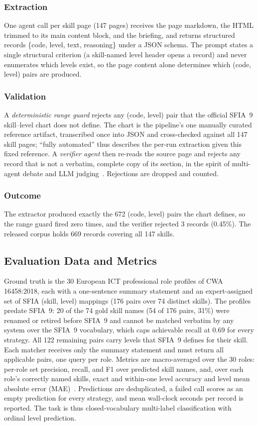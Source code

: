 \documentclass[conference]{IEEEtran}
\begin{document}
\subsubsection{Extraction} One agent call per skill page (147 pages) receives the page markdown, the HTML trimmed to its main content block, and the briefing, and returns structured records \{code, level, text, reasoning\} under a JSON schema. The prompt states a single structural criterion (a skill-named level header opens a record) and never enumerates which levels exist, so the page content alone determines which (code, level) pairs are produced.

\subsubsection{Validation} A \emph{deterministic range guard} rejects any (code, level) pair that the official SFIA~9 skill--level chart does not define. The chart is the pipeline's one manually curated reference artifact, transcribed once into JSON and cross-checked against all 147 skill pages; ``fully automated'' thus describes the per-run extraction given this fixed reference. A \emph{verifier agent} then re-reads the source page and rejects any record that is not a verbatim, complete copy of its section, in the spirit of multi-agent debate and LLM judging~\cite{du2024debate,chan2024chateval}. Rejections are dropped and counted.

\subsubsection{Outcome} The extractor produced exactly the 672 (code, level) pairs the chart defines, so the range guard fired zero times, and the verifier rejected 3 records (0.45\%). The released corpus holds 669 records covering all 147 skills.

\subsection{Evaluation Data and Metrics}\label{sec:evaldata}
Ground truth is the 30 European ICT professional role profiles of CWA 16458:2018, each with a one-sentence summary statement and an expert-assigned set of SFIA (skill, level) mappings (176 pairs over 74 distinct skills). The profiles predate SFIA~9: 20 of the 74 gold skill names (54 of 176 pairs, 31\%) were renamed or retired before SFIA~9 and cannot be matched verbatim by any system over the SFIA~9 vocabulary, which caps achievable recall at 0.69 for every strategy. All 122 remaining pairs carry levels that SFIA~9 defines for their skill. Each matcher receives only the summary statement and must return all applicable pairs, one query per role. Metrics are macro-averaged over the 30 roles: per-role set precision, recall, and F1 over predicted skill names, and, over each role's correctly named skills, exact and within-one level accuracy and level mean absolute error (MAE)~\cite{baccianella2009ordinal}. Predictions are deduplicated, a failed call scores as an empty prediction for every strategy, and mean wall-clock seconds per record is reported. The task is thus closed-vocabulary multi-label classification with ordinal level prediction.
\end{document}
